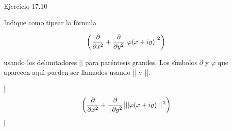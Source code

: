 \centerline{Ejercicio 17.10}

\bigskip

 Indique como tipear la f\'ormula

$$ \biggl({\partial \over \partial x^2} + {\partial \over 
\partial y^2}\bigl|\varphi(x + iy)\bigr|^2\biggr)$$



\noindent usando los delimitadores |\bigg| para par\'entesis
grandes. Los s\'{\i}mbolos $\partial$ y $\varphi$ que aparecen
aqu\'{\i} pueden ser llamados usando |\partial| y |\varphi|.

\bigskip 

\respuestaS

|$$ \biggl({\partial \over \partial x^2} + {\partial \over |

|\partial y^2}\bigl|{\tt \char`\|}
|\varphi(x + iy)\bigr|{\tt \char`\|}|^2\biggr)$$|
\bye


